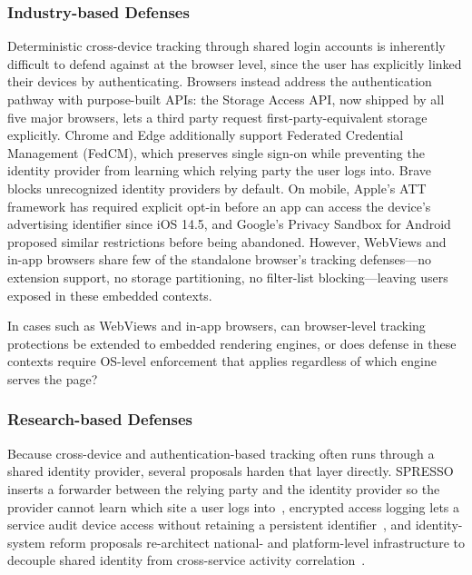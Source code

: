 \subsubsection{Industry-based Defenses}
\label{sec:mixed-defenses-industry}


%
Deterministic cross-device tracking through shared login accounts is inherently difficult to defend against at the browser level, since the user has explicitly linked their devices by authenticating.
%
Browsers instead address the authentication pathway with purpose-built APIs: the Storage Access API, now shipped by all five major browsers, lets a third party request first-party-equivalent storage explicitly. Chrome and Edge additionally support Federated Credential Management (FedCM), which preserves single sign-on while preventing the identity provider from learning which relying party the user logs into. Brave blocks unrecognized identity providers by default.
%
On mobile, Apple's ATT framework has required explicit opt-in before an app can access the device's advertising identifier since iOS 14.5, and Google's Privacy Sandbox for Android proposed similar restrictions before being abandoned.
%
However, WebViews and in-app browsers share few of the standalone browser's tracking defenses---no extension support, no storage partitioning, no filter-list blocking---leaving users exposed in these embedded contexts.

\begin{opbox}
In cases such as WebViews and in-app browsers, can browser-level tracking protections be extended to embedded rendering engines, or does defense in these contexts require OS-level enforcement that applies regardless of which engine serves the page?
\end{opbox}


\subsubsection{Research-based Defenses}
\label{sec:mixed-defenses-research}



%
Because cross-device and authentication-based tracking often runs through a shared identity provider, several proposals harden that layer directly.
%
SPRESSO inserts a forwarder between the relying party and the identity provider so the provider cannot learn which site a user logs into~\cite{fettSPRESSOSecurePrivacyRespecting2015}, encrypted access logging lets a service audit device access without retaining a persistent identifier~\cite{ortegaperezEncryptedAccessLogging2025}, and identity-system reform proposals re-architect national- and platform-level infrastructure to decouple shared identity from cross-service activity correlation~\cite{brandaoMendingTwoNationScale2015}.


